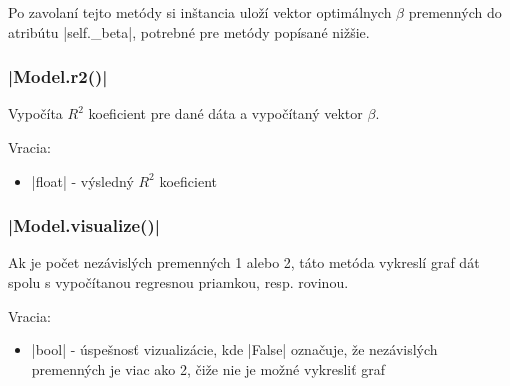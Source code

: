 \documentclass[report.tex]{subfiles}
\begin{document}
Po zavolaní tejto metódy si inštancia uloží vektor optimálnych $\beta$ premenných do atribútu \pyth|self._beta|, potrebné pre metódy popísané nižšie.

\subsubsection*{\pyth|Model.r2()|}

Vypočíta $R^2$ koeficient pre dané dáta a vypočítaný vektor $\beta$.

Vracia:

\begin{itemize}
	\item \pyth|float| - výsledný $R^2$ koeficient
\end{itemize}

\subsubsection*{\pyth|Model.visualize()|}

Ak je počet nezávislých premenných 1 alebo 2, táto metóda vykreslí graf dát spolu s vypočítanou regresnou priamkou, resp. rovinou. 

Vracia:

\begin{itemize}
	\item \pyth|bool| - úspešnosť vizualizácie, kde \pyth|False| označuje, že nezávislých premenných je viac ako 2, čiže nie je možné vykresliť graf
\end{itemize}
\end{document}
